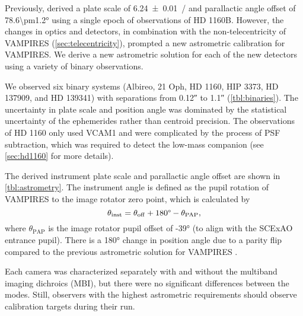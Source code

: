 Previously, \citet{currie_images_2022} derived a plate scale of \SI{6.24\pm0.01}{\mas/\pixel} and parallactic angle offset of \ang{78.6\pm1.2} using a single epoch of observations of HD 1160B.  However, the changes in optics and detectors, in combination with the non-telecentricity of VAMPIRES (\autoref{sec:telecentricity}), prompted a new astrometric calibration for VAMPIRES.  We derive a new astrometric solution for each of the new detectors using a variety of binary observations.

We observed six binary systems (Albireo, 21 Oph, HD 1160, HIP 3373, HD 137909, and HD 139341) with separations from \ang{;;0.12} to \ang{;;1.1} (\autoref{tbl:binaries}). The uncertainty in plate scale and position angle was dominated by the statistical uncertainty of the ephemerides rather than centroid precision. The observations of HD 1160 only used VCAM1 and were complicated by the process of PSF subtraction, which was required to detect the low-mass companion (see \autoref{sec:hd1160} for more details).

The derived instrument plate scale and parallactic angle offset are shown in \autoref{tbl:astrometry}. The instrument angle is defined as the pupil rotation of VAMPIRES to the image rotator zero point, which is calculated by
\begin{equation}
    \theta_\mathrm{inst} = \theta_\mathrm{off} + 180\text{\textdegree} - \theta_\mathrm{PAP},
\end{equation}
where $\theta_\mathrm{PAP}$ is the image rotator pupil offset of \ang{-39} (to align with the SCExAO entrance pupil). There is a \ang{180} change in position angle due to a parity flip compared to the previous astrometric solution for VAMPIRES \citep{currie_images_2022}.

Each camera was characterized separately with and without the multiband imaging dichroics (MBI), but there were no significant differences between the modes. Still, observers with the highest astrometric requirements should observe calibration targets during their run.

